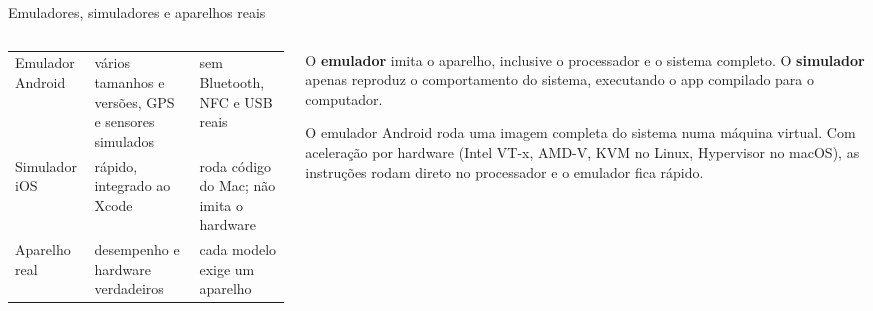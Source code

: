 \begin{frame}{Emuladores, simuladores e aparelhos reais}
  \begin{columns}[T]
    \begin{column}{0.5\textwidth}
      \scriptsize
      \begin{tabularx}{\linewidth}{@{}l L L@{}}
        \toprule
        &  &  \\
        \midrule
        Emulador Android & vários tamanhos e versões, GPS e sensores simulados & sem Bluetooth, NFC e USB reais \\
        Simulador iOS & rápido, integrado ao Xcode & roda código do Mac; não imita o hardware \\
        Aparelho real & desempenho e hardware verdadeiros & cada modelo exige um aparelho \\
        \bottomrule
      \end{tabularx}
    \end{column}
    \begin{column}{0.48\textwidth}
      \begin{definicao}
        O \textbf{emulador} imita o aparelho, inclusive o processador e o sistema completo. O \textbf{simulador} apenas reproduz o comportamento do sistema, executando o app compilado para o computador.
      \end{definicao}
      \begin{pordentro}
        O emulador Android roda uma imagem completa do sistema numa máquina virtual. Com aceleração por hardware (Intel VT-x, AMD-V, KVM no Linux, Hypervisor no macOS), as instruções rodam direto no processador e o emulador fica rápido.
      \end{pordentro}
    \end{column}
  \end{columns}
\end{frame}

